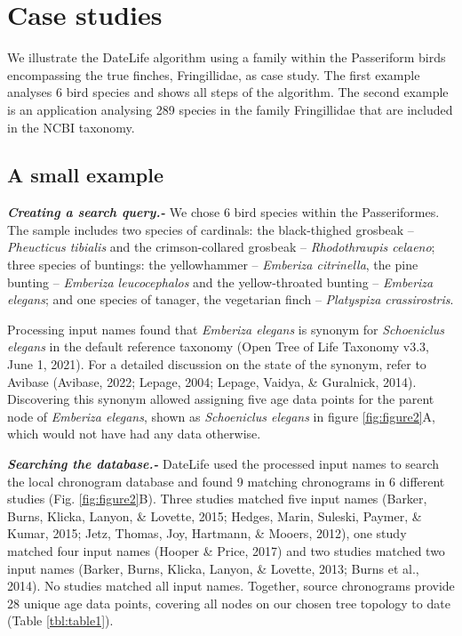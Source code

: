 \documentclass[
  man]{apa6}
\begin{document}
\hypertarget{case-studies}{%
\section{Case studies}\label{case-studies}}

We illustrate the DateLife algorithm using a family within the Passeriform birds encompassing the true finches, Fringillidae, as case study. The first example analyses 6 bird species and shows all steps of the algorithm. The second example is an application analysing 289 species in the family Fringillidae that are included in the NCBI taxonomy.

\hypertarget{a-small-example}{%
\subsection{A small example}\label{a-small-example}}

\emph{\textbf{Creating a search query.-}}
We chose 6 bird species within the Passeriformes. The sample includes
two species of cardinals:
the black-thighed grosbeak -- \emph{Pheucticus tibialis} and
the crimson-collared grosbeak -- \emph{Rhodothraupis celaeno};
three species of buntings:
the yellowhammer -- \emph{Emberiza citrinella},
the pine bunting -- \emph{Emberiza leucocephalos} and
the yellow-throated bunting -- \emph{Emberiza elegans};
and one species of tanager, the vegetarian finch -- \emph{Platyspiza crassirostris}.

Processing input names found that \emph{Emberiza elegans} is synonym for \emph{Schoeniclus elegans} in the default reference taxonomy (Open Tree of Life Taxonomy v3.3, June 1, 2021). For a detailed discussion on the state of the synonym, refer to Avibase (Avibase, 2022; Lepage, 2004; Lepage, Vaidya, \& Guralnick, 2014).
Discovering this synonym allowed assigning five age data points for the parent node of \emph{Emberiza elegans}, shown as \emph{Schoeniclus elegans} in figure \ref{fig:figure2}A, which would not have had any data otherwise.
\vspace{5mm}

\emph{\textbf{Searching the database.-}}
DateLife used the processed input names to search the local chronogram database and found 9 matching chronograms in 6 different studies (Fig. \ref{fig:figure2}B). Three studies matched five input names (Barker, Burns, Klicka, Lanyon, \& Lovette, 2015; Hedges, Marin, Suleski, Paymer, \& Kumar, 2015; Jetz, Thomas, Joy, Hartmann, \& Mooers, 2012), one study matched four input names (Hooper \& Price, 2017) and two studies matched two input names (Barker, Burns, Klicka, Lanyon, \& Lovette, 2013; Burns et al., 2014). No studies matched all input names. Together, source chronograms provide 28 unique age data points, covering all nodes on our chosen tree topology to date (Table \ref{tbl:table1}).
\end{document}
